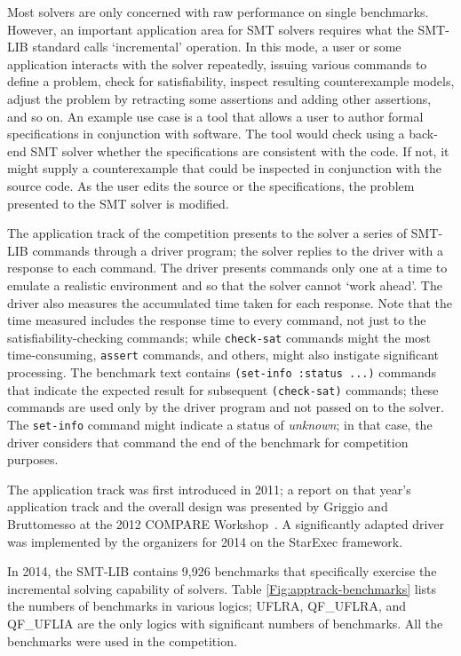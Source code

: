 \documentclass[twoside,11pt]{article}
\begin{document}
Most solvers are only concerned with raw performance on single benchmarks. However, an important application area for SMT solvers requires what the SMT-LIB standard calls `incremental' operation.
In this mode, a user or some application interacts with the solver repeatedly, issuing various commands to define a problem, check for satisfiability, inspect resulting counterexample models, adjust the problem by retracting some assertions and adding other assertions, and so on. An example use case is a tool that allows a user to author formal specifications in conjunction with software. The tool would
check using a back-end SMT solver whether the specifications are consistent with the code. If not, it might
supply a counterexample that could be inspected in conjunction with the source code. As the user edits the source or the specifications, the problem presented to the SMT solver is modified. 

The application track of the competition presents to the solver a series of SMT-LIB commands through a driver program; the solver replies to the driver with a 
response to each command. The driver presents commands only one at a time to emulate a realistic environment and so that the solver cannot `work ahead'. The driver also measures the accumulated time taken for each response. Note that the time measured includes the response time to every command, not just to the satisfiability-checking commands; while \texttt{check-sat} commands might the most time-consuming, \texttt{assert} commands, and others, might also instigate significant processing. The benchmark text contains \texttt{(set-info :status ...)} commands that 
indicate the expected result for subsequent \texttt{(check-sat)} commands; these commands are used only by the driver program and not passed on to the solver. The \texttt{set-info} command might indicate a status of \emph{unknown}; in that case, the driver
considers that command the end of the benchmark for competition purposes.

The application track was first introduced in 2011; a report on that year's application track and the overall design was presented by Griggio and Bruttomesso at the 2012 COMPARE Workshop~\cite{ag+rb+12}. A significantly adapted driver was implemented by the organizers for 2014 on the StarExec framework.

In 2014, the SMT-LIB contains 9,926 benchmarks that  specifically  exercise the incremental solving capability of solvers. Table \ref{Fig:apptrack-benchmarks} lists the numbers of benchmarks in various logics; UFLRA, QF\_UFLRA, and QF\_UFLIA are the only logics with significant numbers of benchmarks. All the benchmarks were used in the competition.
\end{document}
